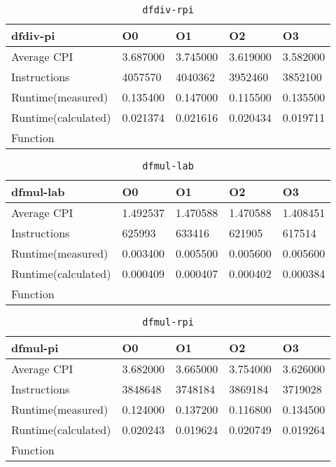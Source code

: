 \begin{table}[ht!]
\centering
\caption{\texttt{dfdiv-rpi}}
\label{tab:dfdiv-rpi}
\begin{tabular}{|l|l|l|l|l|}
\hline
\textbf{dfdiv-pi}	&	\textbf{O0}	&	\textbf{O1}	&	\textbf{O2}	&	\textbf{O3}	\\\hline\hline
Average CPI	&	3.687000	&	3.745000	&	3.619000	&	3.582000	\\\hline
Instructions	&	4057570	&	4040362	&	3952460	&	3852100	\\\hline
Runtime(measured)	&	0.135400	&	0.147000	&	0.115500	&	0.135500	\\\hline
Runtime(calculated)	&	0.021374	&	0.021616	&	0.020434	&	0.019711	\\\hline
Function	&		&		&		&		\\\hline
\end{tabular}
\end{table}
\begin{table}[ht!]
\centering
\caption{\texttt{dfmul-lab}}
\label{tab:dfmul-lab}
\begin{tabular}{|l|l|l|l|l|}
\hline
\textbf{dfmul-lab}	&	\textbf{O0}	&	\textbf{O1}	&	\textbf{O2}	&	\textbf{O3}	\\\hline\hline
Average CPI	&	1.492537	&	1.470588	&	1.470588	&	1.408451	\\\hline
Instructions	&	625993	&	633416	&	621905	&	617514	\\\hline
Runtime(measured)	&	0.003400	&	0.005500	&	0.005600	&	0.005600	\\\hline
Runtime(calculated)	&	0.000409	&	0.000407	&	0.000402	&	0.000384	\\\hline
Function	&		&		&		&		\\\hline
\end{tabular}
\end{table}
\begin{table}[ht!]
\centering
\caption{\texttt{dfmul-rpi}}
\label{tab:dfmul-rpi}
\begin{tabular}{|l|l|l|l|l|}
\hline
\textbf{dfmul-pi}	&	\textbf{O0}	&	\textbf{O1}	&	\textbf{O2}	&	\textbf{O3}	\\\hline\hline
Average CPI	&	3.682000	&	3.665000	&	3.754000	&	3.626000	\\\hline
Instructions	&	3848648	&	3748184	&	3869184	&	3719028	\\\hline
Runtime(measured)	&	0.124000	&	0.137200	&	0.116800	&	0.134500	\\\hline
Runtime(calculated)	&	0.020243	&	0.019624	&	0.020749	&	0.019264	\\\hline
Function	&		&		&		&		\\\hline
\end{tabular}
\end{table}

